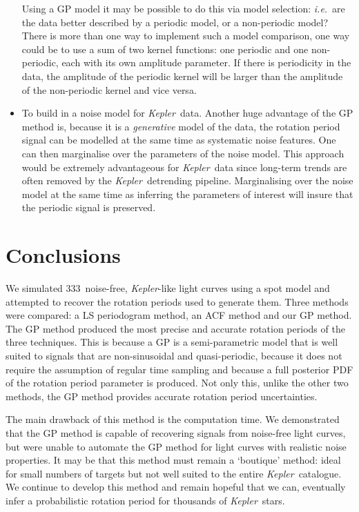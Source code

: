 \documentclass[useAMS, usenatbib, preprint, 12pt]{aastex}
\newcommand{\nlightcurves}{333}
\newcommand{\Kepler}{{\it Kepler}}
\newcommand{\kepler}{\Kepler}
\newcommand{\ie}{{\it i.e.}}
\begin{document}
\begin{itemize}
{Using a GP model it may be possible to do this via model selection: \ie\ are
the data better described by a periodic model, or a non-periodic model?
There is more than one way to implement such a model comparison, one way could
be to use a sum of two kernel functions: one periodic and one non-periodic,
each with its own amplitude parameter.
If there is periodicity in the data, the amplitude of the periodic kernel will
be larger than the amplitude of the non-periodic kernel and vice versa.}
\item{To build in a noise model for \kepler\ data.
Another huge advantage of the GP method is, because it is a {\it generative}
model of the data, the rotation period signal can be modelled at the same time
as systematic noise features.
One can then marginalise over the parameters of the noise model.
This approach would be extremely advantageous for \kepler\ data since
long-term trends are often removed by the \kepler\ detrending pipeline.
Marginalising over the noise model at the same time as inferring the
parameters of interest will insure that the periodic signal is preserved.}
\end{itemize}

\section{Conclusions}

We simulated \nlightcurves\ noise-free, \kepler-like light curves using a spot
model and attempted to recover the rotation periods used to generate them.
Three methods were compared: a LS periodogram method, an ACF method and our GP
method.
The GP method produced the most precise and accurate rotation periods of the
three techniques.
This is because a GP is a semi-parametric model that is well suited to signals
that are non-sinusoidal and quasi-periodic, because it does not require the
assumption of regular time sampling and because a full posterior PDF of the
rotation period parameter is produced.
Not only this, unlike the other two methods, the GP method provides accurate
rotation period uncertainties.

The main drawback of this method is the computation time.
We demonstrated that the GP method is capable of recovering signals from
noise-free light curves, but were unable to automate the GP method for light
curves with realistic noise properties.
It may be that this method must remain a `boutique' method: ideal for small
numbers of targets but not well suited to the entire \kepler\ catalogue.
We continue to develop this method and remain hopeful that we can, eventually
infer a probabilistic rotation period for thousands of \kepler\ stars.




\end{document}
